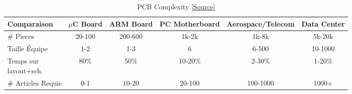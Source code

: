 \footnotesize{
\begin{table}
\caption{PCB Complexity \href{https://www.youtube.com/watch?v=I_MNw4EWer0&t=900s&ab_channel=RobertFeranec}{[Source]}}
\begin{tabular}{l|c|c|c|c|c}
\toprule
Comparaison & $\mu$C\;  Board & ARM Board & PC Motherboard & Aerospace/Telecom & Data Center \\
\midrule
\hline
\# Pieces & 20-100 & 200-600 & 1k-2k & 1k-8k & 5k-20k \\
Taille Équipe & 1-2 & 1-3 & 6 & 6-500 & 10-1000 \\
\makecell{Temps sur\\layout+sch.}  & 80\% & 50\% & 10-20\% & 2-30\% & 1-20\%\\
\# Articles Requis & 0-1 & 10-20 & 20-100 & 100-1000 & 1000+\\
\bottomrule
\end{tabular}
\end{table}}